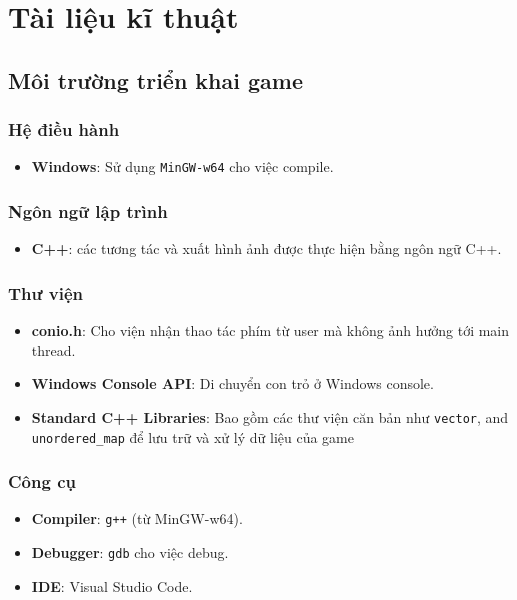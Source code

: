 \documentclass[12pt]{report}
\begin{document}
\chapter{Tài liệu kĩ thuật}
\label{sec:technical_detail}
\section{Môi trường triển khai game}
\subsection*{Hệ điều hành}
\begin{itemize}
    \item \textbf{Windows}: Sử dụng \texttt{MinGW-w64} cho việc compile.
\end{itemize}

\subsection*{Ngôn ngữ lập trình}
\begin{itemize}
    \item \textbf{C++}: các tương tác và xuất hình ảnh được thực hiện bằng ngôn ngữ C++.
\end{itemize}

\subsection*{Thư viện}
\begin{itemize}
    \item \textbf{conio.h}: Cho viện nhận thao tác phím từ user mà không ảnh hưởng tới main thread.
    \item \textbf{Windows Console API}: Di chuyển con trỏ ở Windows console.
    \item \textbf{Standard C++ Libraries}: Bao gồm các thư viện căn bản như \texttt{vector}, and \texttt{unordered\_map} để lưu trữ và xử lý dữ liệu của game
\end{itemize}

\subsection*{Công cụ}
\begin{itemize}
    \item \textbf{Compiler}: \texttt{g++} (từ MinGW-w64).
    \item \textbf{Debugger}: \texttt{gdb} cho việc debug.
    \item \textbf{IDE}: Visual Studio Code.
\end{itemize}
\end{document}
